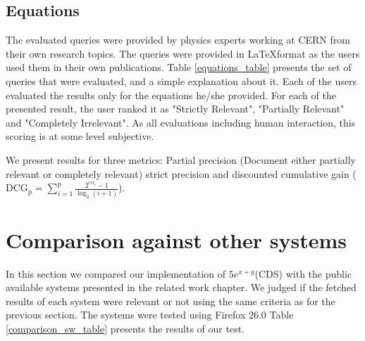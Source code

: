 \subsection{Equations}
The evaluated queries were provided by physics experts working at CERN from their own research topics. The queries were provided in \LaTeX format as the users used them in their own publications.
Table \ref{equations_table} presents the set of queries that were evaluated, and a simple explanation about it. 
Each of the users evaluated the results only for the equations he/she provided. For each of the presented result, the user ranked it as "Strictly Relevant", "Partially Relevant" and "Completely Irrelevant". As all evaluations including human interaction, this scoring is at some level subjective. 

We present results for three metrics: Partial precision (Document either partially relevant or completely relevant) strict precision and discounted cumulative gain ($ \mathrm{DCG_{p}} = \sum_{i=1}^{p} \frac{ 2^{rel_{i}} - 1 }{ \log_{2}(i+1)} $).




\section{Comparison against other systems}
In this section we compared our implementation of $5e^{x+y}$(CDS) with the public available systems presented in the related work chapter. We judged if the fetched results of each system were relevant or not using the same criteria as for the previous section.  The systems were tested using Firefox 26.0
Table \ref{comparison_sw_table} presents the results of our test.

